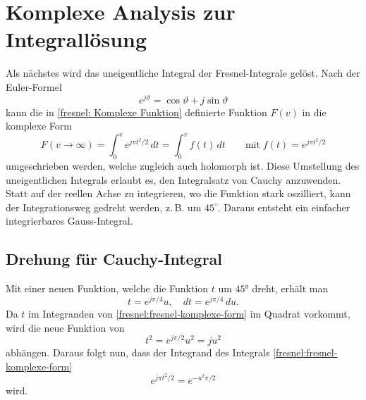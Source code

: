 \section{Komplexe Analysis zur Integrallösung}
Als nächstes wird das uneigentliche Integral der Fresnel-Integrale gelöst.
%
Nach der Euler-Formel
%
\[
e^{j\vartheta}
=
\cos \vartheta + j \sin \vartheta
\]
kann die in \eqref{fresnel: Komplexe Funktion} definierte Funktion $F(v)$ in die komplexe Form
\begin{equation}
    F(v \to \infty)
    =
    \int_{0}^{v} e^{j \pi t^2 / 2} \,dt
    =
    \int_{0}^{v} f(t) \,dt
    \qquad
    \text{mit}
    \;
    f(t) = e^{j\pi t^2/2}
    \label{fresnel:fresnel-komplexe-form}
\end{equation}
umgeschrieben werden, welche zugleich auch holomorph ist.
Diese Umstellung des uneigentlichen Integrals erlaubt es, den Integralsatz von Cauchy anzuwenden.
%
Statt auf der reellen Achse zu integrieren,
wo die Funktion stark oszilliert,
kann der Integrationsweg gedreht werden,
z.\,B. um $45^{\circ}$.
Daraus entsteht ein einfacher integrierbares Gauss-Integral.
%

\subsection{Drehung für Cauchy-Integral}\label{fresnel:Drehung-Cauchy}
Mit einer neuen Funktion, welche die Funktion $t$ um $\ang{45}$ dreht, erhält man 
\begin{equation}
    t 
    = 
    e^{j \pi / 4} u,
    \quad
    dt 
    = 
    e^{j \pi / 4} \,du.
    \label{fresnel:komplexe-form-substitution}
\end{equation}
Da $t$ im Integranden von \eqref{fresnel:fresnel-komplexe-form} im Quadrat vorkommt, wird die neue Funktion von
\[
t^2
=
e^{j \pi / 2} u^2
=
j u^2
\]
abhängen. 
Daraus folgt nun, 
dass der Integrand des Integrals \eqref{fresnel:fresnel-komplexe-form}
\begin{equation}
    e^{j \pi t^2 / 2}
    =
    e^{-u^2 \pi / 2}
    \label{fresnel:komplexer-term-umstellung}
\end{equation}
wird.

